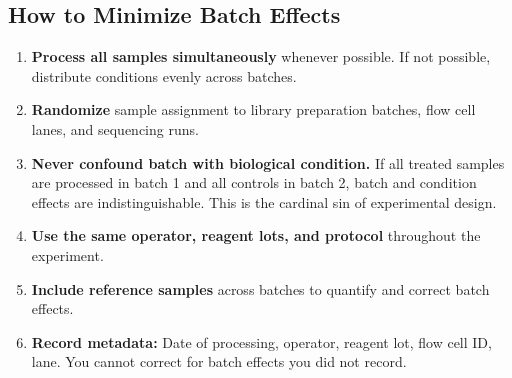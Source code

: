 \subsection{How to Minimize Batch Effects}

\begin{protocolbox}[title={Batch Effect Prevention Strategy}]
\begin{enumerate}[itemsep=3pt]
  \item \textbf{Process all samples simultaneously} whenever possible. If not possible, distribute conditions evenly across batches.
  \item \textbf{Randomize} sample assignment to library preparation batches, flow cell lanes, and sequencing runs.
  \item \textbf{Never confound batch with biological condition.} If all treated samples are processed in batch 1 and all controls in batch 2, batch and condition effects are indistinguishable. This is the cardinal sin of experimental design.
  \item \textbf{Use the same operator, reagent lots, and protocol} throughout the experiment.
  \item \textbf{Include reference samples} across batches to quantify and correct batch effects.
  \item \textbf{Record metadata:} Date of processing, operator, reagent lot, flow cell ID, lane. You cannot correct for batch effects you did not record.
\end{enumerate}
\end{protocolbox}

